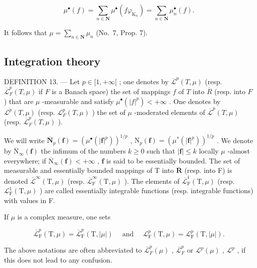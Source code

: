 \[
\mu^ {\bullet} (f) = \sum_ {n \in \mathbf {N}} \mu^ {\bullet} (f \varphi_ {\mathrm{K} _ {n}}) = \sum_ {n \in \mathbf {N}} \mu_ {n} ^ {\bullet} (f).
\]

It follows that \(\mu = \sum_{n\in \mathbf{N}}\mu_n\) (No.~7, Prop. 7).

\subsection{Integration theory}

DEFINITION 13. --- Let \(p \in [1, +\infty[\) ; one denotes by \(\overline{\mathcal{L}}^p(T, \mu)\) (resp. \(\overline{\mathcal{L}}_F^p(T, \mu)\) if \(F\) is a Banach space) the set of mappings \(f\) of \(T\) into \(\overline{R}\) (resp. into \(F\) ) that are \(\mu\) -measurable and satisfy \(\mu^\bullet(|f|^p) < +\infty\) . One denotes by \(\mathcal{L}^p(T, \mu)\) (resp. \(\mathcal{L}_F^p(T, \mu)\) ) the set of \(\mu\) -moderated elements of \(\overline{\mathcal{L}}^p(T, \mu)\) (resp. \(\overline{\mathcal{L}}_F^p(T, \mu)\) ).

We will write \(\overline{\mathbf{N}}_p(\mathbf{f}) = (\mu^\bullet (|\mathbf{f}|^p))^{1 / p}\) , \(\mathrm{N}_p(\mathbf{f}) = (\mu^* (|\mathbf{f}|^p))^{1 / p}\) . We denote by \(\overline{\mathrm{N}}_{\infty}(\mathbf{f})\) the infimum of the numbers \(k\geqslant 0\) such that \(|\mathbf{f}|\leqslant k\) locally \(\mu\) -almost everywhere; if \(\overline{\mathrm{N}}_{\infty}(\mathbf{f}) < + \infty\) , \(\mathbf{f}\) is said to be essentially bounded. The set of measurable and essentially bounded mappings of T into \(\overline{\mathbf{R}}\) (resp. into F) is denoted \(\overline{\mathcal{L}}^{\infty}(\mathrm{T},\mu)\) (resp. \(\overline{\mathcal{L}}_{\mathrm{F}}^{\infty}(\mathrm{T},\mu)\) ). The elements of \(\overline{\mathcal{L}}_{\mathrm{F}}^{1}(\mathrm{T},\mu)\) (resp. \(\mathcal{L}_{\mathrm{F}}^{1}(\mathrm{T},\mu)\) ) are called essentially integrable functions (resp. integrable functions) with values in F.

If \(\mu\) is a complex measure, one sets

\[
\overline {{{{\mathcal {L}}}}} _ {\mathrm{F}} ^ {p} (\mathrm{T}, \mu) = \overline {{{{\mathcal {L}}}}} _ {\mathrm{F}} ^ {p} (\mathrm{T}, | \mu |) \quad \text { and } \quad \mathcal {L} _ {\mathrm{F}} ^ {p} (\mathrm{T}, \mu) = \mathcal {L} _ {\mathrm{F}} ^ {p} (\mathrm{T}, | \mu |).
\]

The above notations are often abbreviated to \(\overline{\mathcal{L}}_F^p (\mu)\) , \(\overline{\mathcal{L}}_F^p\) or \(\mathcal{L}^p (\mu)\) , \(\mathcal{L}^p\) , if this does not lead to any confusion.

